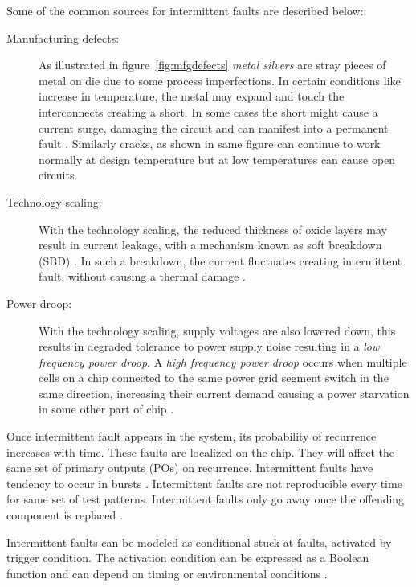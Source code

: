 Some of the common sources for intermittent faults are described below:
\begin{description}
\item[Manufacturing defects:] As illustrated in figure~\ref{fig:mfgdefects} \emph{metal silvers} are stray pieces of metal on die due to some process imperfections. In certain conditions like increase in temperature, the metal may expand and touch the interconnects creating a short. In some cases the short might cause a current surge, damaging the circuit and can manifest into a permanent fault \cite{Hawkins2003}. Similarly cracks, as shown in same figure can continue to work normally at design temperature but at low temperatures can cause open circuits.

\item[Technology scaling:] With the technology scaling, the reduced thickness of oxide layers may result in current leakage, with a mechanism known as soft breakdown (SBD) \cite{Stathis2001}. In such a breakdown, the current fluctuates creating intermittent fault, without causing a thermal damage \cite{Stathis2001, Constantinescu2007a, Constantinescu2007}. 

\item[Power droop:] With the technology scaling, supply voltages are also lowered down, this results in degraded tolerance to power supply noise resulting in a \emph{low frequency power droop}\cite{Polian2007}. A \emph{high frequency power droop} occurs when multiple cells on a chip connected to the same power grid segment switch in the same direction, increasing their current demand causing a power starvation in some other part of chip \cite{Polian2007}. 
\end{description}

Once intermittent fault appears in the system, its probability of recurrence increases with time\cite{Bondavalli2000}. These faults are localized on the chip. They will affect the same set of primary outputs (POs) on recurrence. Intermittent faults have tendency to occur in bursts \cite{Constantinescu2007, Constantinescu2003}. Intermittent faults are not reproducible every time for same set of test patterns. Intermittent faults only go away once the offending component is replaced \cite{Constantinescu2007}.

Intermittent faults can be modeled as conditional stuck-at faults, activated by trigger condition. The activation condition can be expressed as a Boolean function and can depend on timing or environmental conditions \cite{Holst2009}.

